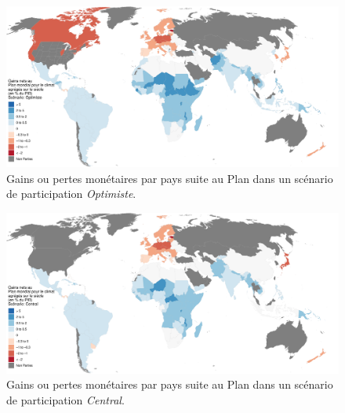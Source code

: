 \documentclass[a5paper,french,openany]{memoir}
\begin{document}
\begin{figure}[h!]
  \caption[Gains nets dans un scénario de participation \textit{Optimiste}]{Gains ou pertes monétaires par pays suite au Plan dans un scénario de participation \textit{Optimiste}.}\label{fig:gain_optimist}
  \centerline{\includegraphics[width=.85\paperwidth]{../figures/maps/Soptimistic_npv_over_gdp_gcs_adj_fr.pdf}} 
\end{figure}
\begin{figure}[b!]
  \caption[Gains nets dans un scénario de participation \textit{Central}]{Gains ou pertes monétaires par pays suite au Plan dans un scénario de participation \textit{Central}.}\label{fig:gain_central}
  \centerline{\includegraphics[width=.85\paperwidth]{../figures/maps/Scentral_npv_over_gdp_gcs_adj_fr.pdf}
    } 
\end{figure}
\end{document}
